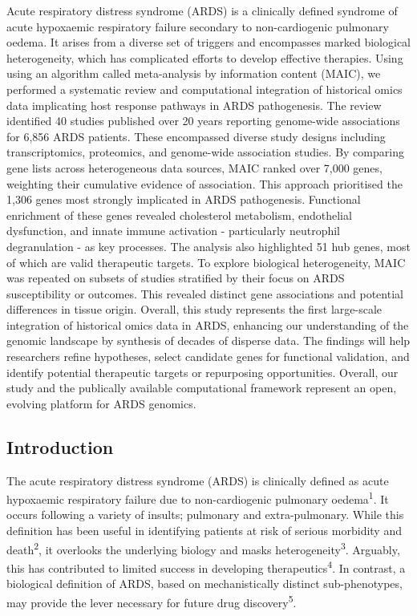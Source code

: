 \documentclass[
  11,
  a4paper,
]{article}
\begin{document}
Acute respiratory distress syndrome (ARDS) is a clinically defined
syndrome of acute hypoxaemic respiratory failure secondary to
non-cardiogenic pulmonary oedema. It arises from a diverse set of
triggers and encompasses marked biological heterogeneity, which has
complicated efforts to develop effective therapies. Using using an
algorithm called meta-analysis by information content (MAIC), we
performed a systematic review and computational integration of
historical omics data implicating host response pathways in ARDS
pathogenesis. The review identified 40 studies published over 20 years
reporting genome-wide associations for 6,856 ARDS patients. These
encompassed diverse study designs including transcriptomics, proteomics,
and genome-wide association studies. By comparing gene lists across
heterogeneous data sources, MAIC ranked over 7,000 genes, weighting
their cumulative evidence of association. This approach prioritised the
1,306 genes most strongly implicated in ARDS pathogenesis. Functional
enrichment of these genes revealed cholesterol metabolism, endothelial
dysfunction, and innate immune activation - particularly neutrophil
degranulation - as key processes. The analysis also highlighted 51 hub
genes, most of which are valid therapeutic targets. To explore
biological heterogeneity, MAIC was repeated on subsets of studies
stratified by their focus on ARDS susceptibility or outcomes. This
revealed distinct gene associations and potential differences in tissue
origin. Overall, this study represents the first large-scale integration
of historical omics data in ARDS, enhancing our understanding of the
genomic landscape by synthesis of decades of disperse data. The findings
will help researchers refine hypotheses, select candidate genes for
functional validation, and identify potential therapeutic targets or
repurposing opportunities. Overall, our study and the publically
available computational framework represent an open, evolving platform
for ARDS genomics.

\newpage

\hypertarget{introduction}{%
\subsection{Introduction}\label{introduction}}

The acute respiratory distress syndrome (ARDS) is clinically defined as
acute hypoxaemic respiratory failure due to non-cardiogenic pulmonary
oedema\textsuperscript{1}. It occurs following a variety of insults;
pulmonary and extra-pulmonary. While this definition has been useful in
identifying patients at risk of serious morbidity and
death\textsuperscript{2}, it overlooks the underlying biology and masks
heterogeneity\textsuperscript{3}. Arguably, this has contributed to
limited success in developing therapeutics\textsuperscript{4}. In
contrast, a biological definition of ARDS, based on mechanistically
distinct sub-phenotypes, may provide the lever necessary for future drug
discovery\textsuperscript{5}.
\end{document}
